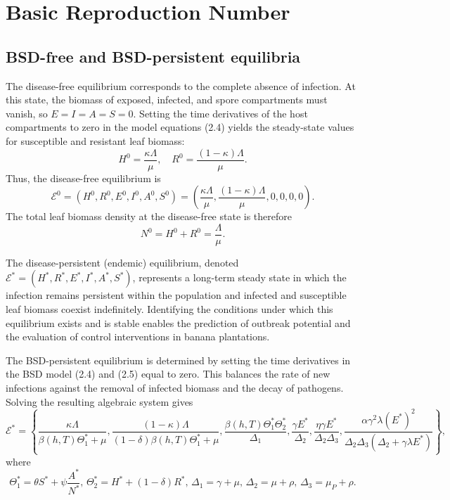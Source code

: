 \documentclass[11pt]{article}
\numberwithin{equation}{section}
\begin{document}
\clearpage
\section{Basic Reproduction Number}\label{sec:R0}
\subsection{BSD-free and BSD-persistent equilibria}\label{subsec:DFE}
The disease-free equilibrium corresponds to the complete absence of infection. At this state, the biomass of exposed, infected, and spore compartments must vanish, so $E = I = A = S = 0$. Setting the time derivatives of the host compartments to zero in the model equations (2.4) yields the steady-state values for susceptible and resistant leaf biomass:
$$H^0 = \frac{\kappa \Lambda}{\mu}, \quad R^0 = \frac{(1 - \kappa) \Lambda}{\mu}.$$
Thus, the disease-free equilibrium is
\begin{equation}\label{eqn2}
\mathcal{E}^0 = \left( H^0, R^0, E^0, I^0, A^0, S^0 \right) = \left( \frac{\kappa \Lambda}{\mu}, \frac{(1 - \kappa) \Lambda}{\mu}, 0, 0, 0, 0 \right).
\end{equation}
The total leaf biomass density at the disease-free state is therefore
$$N^0 = H^0 + R^0 = \frac{\Lambda}{\mu}.$$

The disease-persistent (endemic) equilibrium, denoted $\mathcal{E}^* = (H^*, R^*, E^*, I^*, A^*, S^*)$, represents a long-term steady state in which the infection remains persistent within the population and infected and susceptible leaf biomass coexist indefinitely. Identifying the conditions under which this equilibrium exists and is stable enables the prediction of outbreak potential and the evaluation of control interventions in banana plantations. 

The BSD-persistent equilibrium is determined by setting the time derivatives in the BSD model (2.4) and (2.5) equal to zero. This balances the rate of new infections against the removal of infected biomass and the decay of pathogens. Solving the resulting algebraic system gives
\begin{equation}\label{eqn2a}
    \mathcal{E}^*=\left\{\frac{\kappa\Lambda}{\beta(h,T)\Theta_1^*+\mu},\frac{(1-\kappa)\Lambda}{(1-\delta)\beta(h,T)\Theta_1^*+\mu},\frac{\beta(h,T)\Theta_1^*\Theta_2^*}{\Delta_1},\frac{\gamma E^*}{\Delta_2},\frac{\eta\gamma E^*}{\Delta_2\Delta_3},\frac{\alpha\gamma^2\lambda (E^*)^2}{\Delta_2\Delta_3(\Delta_2+\gamma\lambda E^*)}\right\},
\end{equation}
where 
\[\Theta_1^*=\theta S^*+\psi\frac{A^*}{N^*}, \,\Theta_2^*=H^*+(1-\delta)R^*,\, \Delta_1=\gamma+\mu,\,\Delta_2=\mu+\rho, \, \Delta_3=\mu_P+\rho.\]
\end{document}
